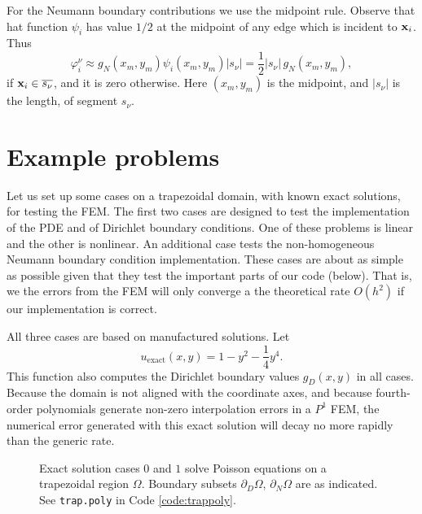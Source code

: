 For the Neumann boundary contributions we use the midpoint rule.  Observe that hat function $\psi_i$ has value $1/2$ at the midpoint of any edge which is incident to $\mathbf{x}_i$.  Thus
\begin{equation}
\varphi_i^\nu \approx g_N(x_m,y_m) \psi_i(x_m,y_m) |s_\nu| = \frac{1}{2} |s_\nu|\, g_N(x_m,y_m), \label{eq:un:segmentquadrature}
\end{equation}
if $\mathbf{x}_i \in \overline{s_\nu}$, and it is zero otherwise.  Here $(x_m,y_m)$ is the midpoint, and $|s_\nu|$ is the length, of segment $s_\nu$.


\section{Example problems}

Let us set up some cases on a trapezoidal domain, with known exact solutions, for testing the FEM.  The first two cases are designed to test the implementation of the PDE and of Dirichlet boundary conditions.  One of these problems is linear and the other is nonlinear.  An additional case tests the non-homogeneous Neumann boundary condition implementation.  These cases are about as simple as possible given that they test the important parts of our code (below).  That is, we the errors from the FEM will only converge a the theoretical rate $O(h^2)$ if our implementation is correct.

All three cases are based on manufactured solutions.  Let
\begin{equation}
  u_{\text{exact}}(x,y) = 1 - y^2 - \frac{1}{4} y^4. \label{eq:un:exactsolution}
\end{equation}
This function also computes the Dirichlet boundary values $g_D(x,y)$ in all cases.  Because the domain is not aligned with the coordinate axes, and because fourth-order polynomials generate non-zero interpolation errors in a $P^1$ FEM, the numerical error generated with this exact solution will decay no more rapidly than the generic rate.

\begin{figure}

\caption{Exact solution cases $0$ and $1$ solve Poisson equations on a trapezoidal region $\Omega$.  Boundary subsets $\partial_D\Omega$, $\partial_N \Omega$ are as indicated.  See \texttt{trap.poly} in Code \ref{code:trappoly}.}
\label{fig:un:trap}
\end{figure}

